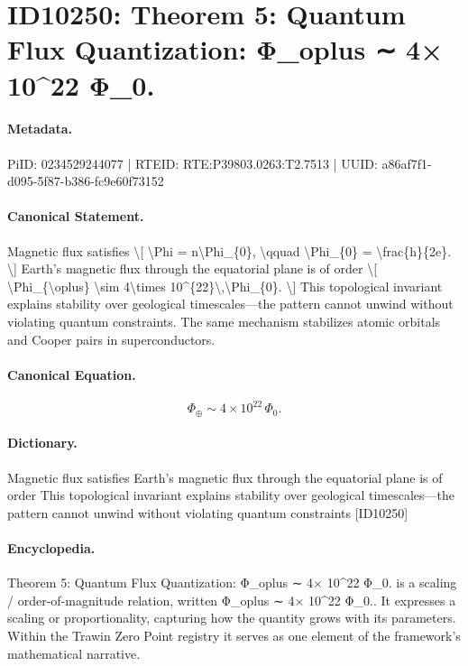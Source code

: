 \section*{ID10250: Theorem 5: Quantum Flux Quantization: Φ\_oplus ∼ 4× 10\textasciicircum{}22 Φ\_0.}
\paragraph{Metadata.}
PiID: 0234529244077 | RTEID: RTE:P39803.0263:T2.7513 | UUID: a86af7f1-d095-5f87-b386-fc9e60f73152

\paragraph{Canonical Statement.}
Magnetic flux satisfies \textbackslash{}[ \textbackslash{}Phi = n\textbackslash{}Phi\_\{0\}, \textbackslash{}qquad \textbackslash{}Phi\_\{0\} = \textbackslash{}frac\{h\}\{2e\}. \textbackslash{}] Earth's magnetic flux through the equatorial plane is of order \textbackslash{}[ \textbackslash{}Phi\_\{\textbackslash{}oplus\} \textbackslash{}sim 4\textbackslash{}times 10\textasciicircum{}\{22\}\textbackslash{},\textbackslash{}Phi\_\{0\}. \textbackslash{}] This topological invariant explains stability over geological timescales—the pattern cannot unwind without violating quantum constraints. The same mechanism stabilizes atomic orbitals and Cooper pairs in superconductors.

\paragraph{Canonical Equation.}
\[
\Phi_{\oplus} \sim 4\times 10^{22}\,\Phi_{0}.
\]

\paragraph{Dictionary.}
Magnetic flux satisfies Earth's magnetic flux through the equatorial plane is of order This topological invariant explains stability over geological timescales—the pattern cannot unwind without violating quantum constraints [ID10250]

\paragraph{Encyclopedia.}
Theorem 5: Quantum Flux Quantization: Φ\_oplus ∼ 4× 10\textasciicircum{}22 Φ\_0. is a scaling / order-of-magnitude relation, written Φ\_oplus ∼ 4× 10\textasciicircum{}22 Φ\_0.. It expresses a scaling or proportionality, capturing how the quantity grows with its parameters. Within the Trawin Zero Point registry it serves as one element of the framework's mathematical narrative.
